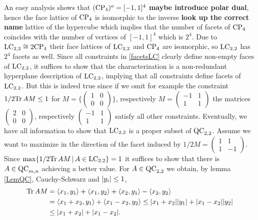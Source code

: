 An easy analysis shows that $ (\textup{CP}_4)^{o}  = [-1,1]^4$ \textbf{maybe introduce polar dual}, hence the face lattice of $ \textup{CP}_4 $ is isomorphic to the inverse \textbf{look up the correct name} lattice of the hypercube which implies that the number of facets of $ \textup{CP}_4 $ coincides with the number of vertices of $ [-1,1]^4 $ which is $ 2^4 $. Due to $  \textup{LC}_{2,2} \cong 2\textup{CP}_4$ their face lattices of $ \textup{LC}_{2,2} $ and $ \textup{CP}_4 $ are isomorphic, so $ \textup{LC}_{2,2} $ has $ 2^4 $ facets as well. 
Since all constraints in \ref{facetsLC} clearly define non-empty faces of $ \textup{LC}_{2,2} $, it suffices to show that the characterization is a non-redundant hyperplane description of $ \textup{LC}_{2,2} $, implying that all constraints define facets of $ \textup{LC}_{2,2} $. But this is indeed true since if we omit for example the constraint 
$ 1/2 \text{Tr} \, {AM}  \le 1 $ for $ M = \{ \begin{pmatrix}
1 & 0 \\ 0 & 0
\end{pmatrix} \} $, respectively $ M = \begin{pmatrix}
-1 & 1 \\ 1 & 1 
\end{pmatrix} $
the matrices $ \begin{pmatrix}
2 & 0 \\ 0 & 0 
\end{pmatrix} $, respectively $ \begin{pmatrix}
-1 & 1 \\ 1 & 1
\end{pmatrix} $ 
satisfy all other constraints. 
Eventually, we have all information to show that $ \textup{LC}_{2,2} $ is a proper subset of $ \textup{QC}_{2,2} $. 
Assume we want to maximize in the direction of the facet induced by $ 1/2M = \begin{pmatrix}
1 & 1 \\ 1 & -1 
\end{pmatrix} $. Since $ \max \{  1/2 \text{Tr} \, {AM} \, | \, A \in \textup{LC}_{2,2} \} = 1 $ it suffices to show that there is $ A \in \textup{QC}_{m,n} $ achieving a better value. For $ A \in \textup{QC}_{2,2} $ we obtain, by lemma \ref{LemQC}, Cauchy-Schwarz and $ {\left|{y_i}\right|}\le 1 $,
\begin{align*}
	\text{Tr} \, {AM} &= \langle x_1,y_1 \rangle + \langle x_1,y_2 \rangle + \langle x_2,y_1 \rangle - \langle x_2,y_2 \rangle   \\
	&= \langle x_1+x_2,y_1 \rangle + \langle x_1-x_2,y_2 \rangle  \le {\left|{x_1+x_2}\right|}{\left|{y_1}\right|} + {\left|{x_1-x_2}\right|}{\left|{y_2}\right|}  \\
	&\le {\left|{x_1+x_2}\right|} + {\left|{x_1-x_2}\right|}.
\end{align*} 

